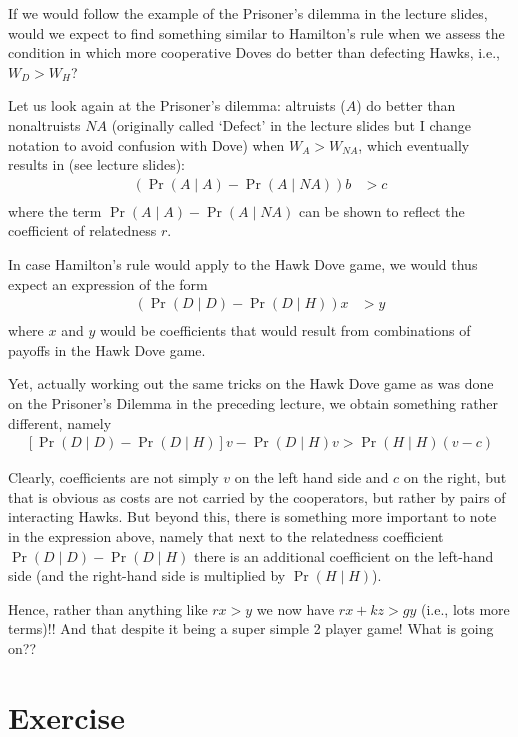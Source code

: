 \documentclass[
]{book}
\begin{document}
If we would follow the example of the Prisoner's dilemma in the lecture slides, would we expect to find something similar to Hamilton's rule when we assess the condition in which more cooperative Doves do better than defecting Hawks, i.e., \(W_{D} > W_{H}\)?

Let us look again at the Prisoner's dilemma: altruists (\(A\)) do better than nonaltruists \(NA\) (originally called `Defect' in the lecture slides but I change notation to avoid confusion with Dove) when \(W_{A} > W_{NA}\), which eventually results in (see lecture slides):
\begin{align}
\left( \Pr(A \mid A ) - \Pr(A \mid NA ) \right ) b &> c \\
\end{align}
where the term \(\Pr(A \mid A ) - \Pr(A \mid NA )\) can be shown to reflect the coefficient of relatedness \(r\).

In case Hamilton's rule would apply to the Hawk Dove game, we would thus expect an expression of the form
\begin{align}
\left(\Pr(D \mid D) - \Pr(D \mid H ) \right ) x &> y \\
\end{align}
where \(x\) and \(y\) would be coefficients that would result from combinations of payoffs in the Hawk Dove game.

Yet, actually working out the same tricks on the Hawk Dove game as was done on the Prisoner's Dilemma in the preceding lecture, we obtain something rather different, namely
\begin{align}
\left [ \Pr (D \mid D) - \Pr ( D \mid H) \right ] v - \Pr (D \mid H) v > \Pr ( H \mid H ) \left (v - c \right )
\end{align}

Clearly, coefficients are not simply \(v\) on the left hand side and \(c\) on the right, but that is obvious as costs are not carried by the cooperators, but rather by pairs of interacting Hawks. But beyond this, there is something more important to note in the expression above, namely that next to the relatedness coefficient \(\Pr(D \mid D) - \Pr(D \mid H )\) there is an additional coefficient on the left-hand side (and the right-hand side is multiplied by \(\Pr(H\mid H)\)).

Hence, rather than anything like \(r x > y\) we now have \(r x + k z > g y\) (i.e., lots more terms)!! And that despite it being a super simple 2 player game! What is going on??

\hypertarget{exercise-7}{%
\section{Exercise}\label{exercise-7}}
\end{document}
